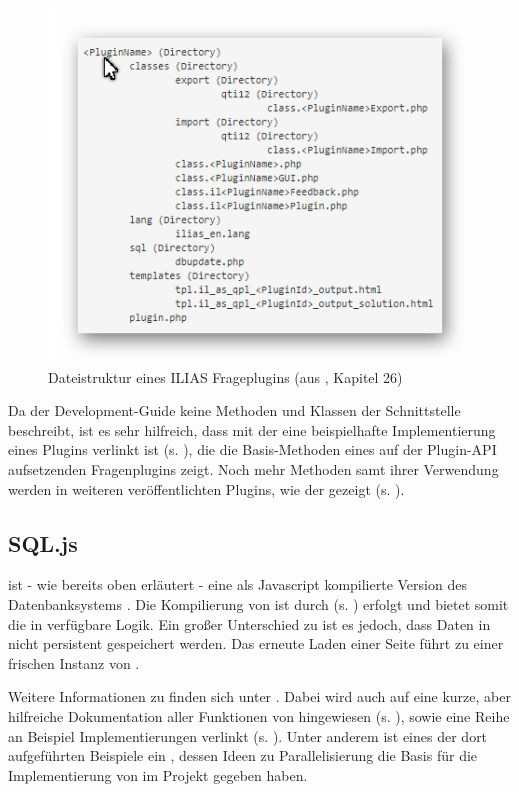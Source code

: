     \begin{figure}[H]
        \begin{center}
            \includegraphics[page=1, width=0.3\paperwidth, trim=4 4 4 4, clip]{fig/ILIAS-Dateistruktur.png} 
            \caption{Dateistruktur eines ILIAS Frageplugins (aus \cite{IliasDevelopmentGuide}, Kapitel 26)}
            \label{fig:ilias-dateistruktur}
        \end{center}
    \end{figure}
    
    Da der Development-Guide keine Methoden und Klassen der Schnittstelle beschreibt, ist es sehr hilfreich, dass mit der  eine beispielhafte Implementierung eines Plugins verlinkt ist (s. \cite{AssExampleQuestion}), die die Basis-Methoden eines auf der  Plugin-API aufsetzenden Fragenplugins zeigt. Noch mehr Methoden samt ihrer Verwendung werden in weiteren veröffentlichten Plugins, wie der  gezeigt (s. \cite{AssCodeQuestion}).

\subsection{SQL.js}
\label{subsec:sql-js}

     ist - wie bereits oben erläutert - eine als Javascript kompilierte Version des Datenbanksystems . Die Kompilierung von  ist durch  (s. \cite{Emscripten}) erfolgt und bietet somit die in  verfügbare  Logik. Ein großer Unterschied zu  ist es jedoch, dass Daten in  nicht persistent gespeichert werden. Das erneute Laden einer Seite führt zu einer frischen Instanz von .
    
    Weitere Informationen zu  finden sich unter \cite{SQLjs}. Dabei wird auch auf eine kurze, aber hilfreiche Dokumentation aller Funktionen von  hingewiesen (s. \cite{SQLjsDocu}), sowie eine Reihe an Beispiel Implementierungen verlinkt (s. \cite{SQLjsExa}). Unter anderem ist eines der dort aufgeführten Beispiele ein , dessen Ideen zu Parallelisierung die Basis für die Implementierung von  im  Projekt gegeben haben.